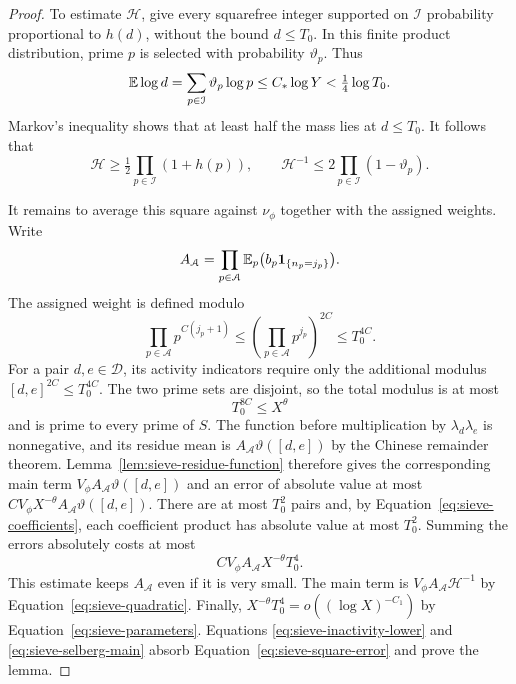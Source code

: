 \begin{proof}
To estimate $\mathcal H$, give every squarefree integer supported on
$\mathcal I$ probability proportional to $h(d)$, without the bound
$d\le T_0$.  In this finite product distribution, prime $p$ is selected
with probability $\vartheta_p$.  Thus
\[
 \mathbb E\log d=\sum_{p\in\mathcal I}\vartheta_p\log p
       \le C_*\log Y<\tfrac14\log T_0.
\]
Markov's inequality shows that at least half the mass lies at $d\le T_0$.
It follows that
\begin{equation}\label{eq:sieve-selberg-main}
 \mathcal H\ge\tfrac12\prod_{p\in\mathcal I}(1+h(p)),
 \qquad
 \mathcal H^{-1}\le2\prod_{p\in\mathcal I}(1-\vartheta_p).
\end{equation}

It remains to average this square against $\nu_\phi$ together with the
assigned weights.  Write
\[
 A_{\mathcal A}=
   \prod_{p\in\mathcal A}\mathbb E_p
        \bigl(b_p\mathbf 1_{\{n_p=j_p\}}\bigr).
\]
The assigned weight is defined modulo
\[
 \prod_{p\in\mathcal A}p^{C(j_p+1)}
 \le\left(\prod_{p\in\mathcal A}p^{j_p}\right)^{2C}
 \le T_0^{4C}.
\]
For a pair $d,e\in\mathcal D$, its activity indicators require only the
additional modulus $[d,e]^{2C}\le T_0^{4C}$.  The two prime sets are
disjoint, so the total modulus is at most
\begin{equation}\label{eq:sieve-modulus-budget}
 T_0^{8C}\le X^\theta
\end{equation}
and is prime to every prime of $S$.  The function before multiplication
by $\lambda_d\lambda_e$ is nonnegative, and its residue mean is
$A_{\mathcal A}\vartheta([d,e])$ by the Chinese remainder theorem.
Lemma~\ref{lem:sieve-residue-function} therefore gives the corresponding
main term $V_\phi A_{\mathcal A}\vartheta([d,e])$ and an error of absolute
value at most
$C V_\phi X^{-\theta}A_{\mathcal A}\vartheta([d,e])$.
There are at most $T_0^2$ pairs and, by
Equation~\eqref{eq:sieve-coefficients}, each coefficient product has
absolute value at most $T_0^2$.  Summing the errors absolutely costs at
most
\begin{equation}\label{eq:sieve-square-error}
 C V_\phi A_{\mathcal A}X^{-\theta}T_0^4.
\end{equation}
This estimate keeps $A_{\mathcal A}$ even if it is very small.
The main term is $V_\phi A_{\mathcal A}\mathcal H^{-1}$ by
Equation~\eqref{eq:sieve-quadratic}.  Finally,
$X^{-\theta}T_0^4=o((\log X)^{-C_1})$ by
Equation~\eqref{eq:sieve-parameters}.  Equations
\eqref{eq:sieve-inactivity-lower} and
\eqref{eq:sieve-selberg-main} absorb
Equation~\eqref{eq:sieve-square-error} and prove the lemma.
\end{proof}

